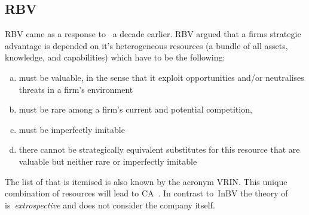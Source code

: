 \subsection{\gls{RBV}} %

\Gls{RBV} came as a response to~\cite{Porter:1980} a decade earlier.
\Gls{RBV} argued that a firms strategic advantage is depended on it's heterogeneous resources (a bundle of all assets, knowledge, and capabilities) which have to be the following:

\begin{enumerate}[(a)]
   \setlength{\itemsep}{1pt}
\item must be valuable, in the sense that it exploit opportunities and/or neutralises threats in a firm’s environment
\item must be rare among a firm’s current and potential competition, 
\item must be imperfectly imitable
\item  there cannot be strategically equivalent substitutes for this resource that are valuable but neither rare or imperfectly imitable 
\end{enumerate} 
The list of that is itemised is also known by the acronym VRIN\@.
This unique combination of resources will lead to \gls{CA}~\cite{Barney:1991}. 
In contrast to~\gls{InBV} the theory of~\cite{Barney:1991} is~\emph{extrospective} and does not consider the company itself.
